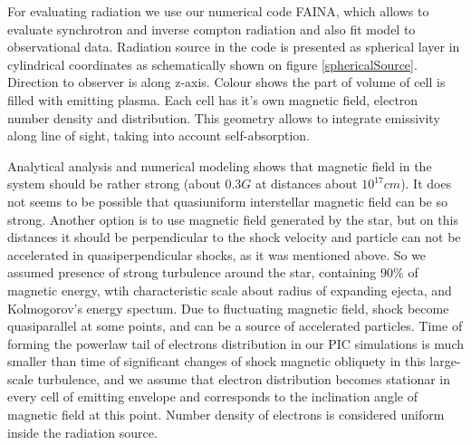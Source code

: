\documentclass[a4paper,12pt]{extreport}
\begin{document}
For evaluating radiation we use our numerical code FAINA, which allows to evaluate synchrotron and inverse compton radiation and also fit model to observational data. Radiation source in the code is presented as spherical layer in cylindrical coordinates as schematically shown on figure \ref{sphericalSource}. Direction to observer is along z-axis. Colour shows the part of volume of cell is filled with emitting plasma. Each cell has it's own magnetic field, electron number density and distribution. This geometry allows to integrate emissivity along line of sight, taking into account self-absorption.

Analytical analysis \cite{Coppejans2020} and numerical modeling \cite{BykovUniverse} shows that magnetic field in the system should be rather strong (about $0.3 G$ at distances about $10^{17} cm$). It does not seems to be possible that quasiuniform interstellar magnetic field can be so strong. Another option is to use magnetic field generated by the star, but on this distances it should be perpendicular to the shock velocity \cite{Parker} and particle can not be accelerated in quasiperpendicular shocks, as it was mentioned above. So we assumed presence of strong turbulence around the star, containing $90 \%$ of magnetic energy, wtih characteristic scale about radius of expanding ejecta, and Kolmogorov's energy spectum. Due to fluctuating magnetic field, shock become quasiparallel at some points, and can be a source of accelerated particles. Time of forming the powerlaw tail of electrons distribution in our PIC simulations is much smaller than time of significant changes of shock magnetic obliquety in this large-scale turbulence, and we assume that electron distribution becomes stationar in every cell of emitting envelope and corresponds to the inclination angle of magnetic field at this point. Number density of electrons is considered uniform inside the radiation source.
\end{document}
